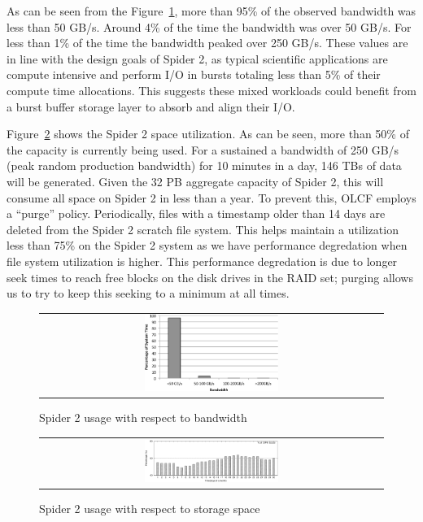 As can be seen from the Figure~\ref{fig:bwUsage}, more than 95\% of the 
observed bandwidth was less than 50 GB/s. Around 4\% of the time the bandwidth
was over 50 GB/s. For less than 1\% of the time the bandwidth peaked over
250 GB/s. These values are in line with the design goals of Spider 2, as
typical scientific applications are compute intensive and perform
I/O in bursts totaling less than 5\% of their compute time allocations. This suggests these 
mixed workloads could benefit from a burst buffer storage layer to absorb and align 
their I/O.

Figure~\ref{fig:storageUsage} shows the Spider 2 space utilization. As can be
seen, more than 50\% of the capacity is currently being used.  For a sustained a
bandwidth of 250 GB/s (peak random production bandwidth) for 10 minutes in a
day, 146 TBs of data will be generated. Given the 32 PB aggregate capacity of
Spider 2, this will consume all space on Spider 2 in less than a year. To
prevent this, OLCF employs a ``purge'' policy. Periodically, files with a
timestamp older than 14 days are deleted from the Spider 2 scratch file system.
This helps maintain a utilization less than 75\% on the Spider 2 system as we 
have performance degredation when file system utilization is higher. This performance 
degredation is due to longer seek times to reach free blocks on the disk drives in the 
RAID set; purging allows us to try to keep this seeking to a minimum at all times.


\begin{figure}[!thb]
\begin{center}
\begin{tabular}{c}
{\includegraphics[width=0.40\textwidth]{./figs/bwUsage.eps}}\\
\end{tabular}
\vspace{-0.1in}
\caption{Spider 2 usage with respect to bandwidth}
\label{fig:bwUsage}
\end{center}
\end{figure}



\begin{figure}[!thb]
\begin{center}
\begin{tabular}{c}
{\includegraphics[width=0.40\textwidth]{./figs/storageUsage.eps}}\\
\end{tabular}
\vspace{-0.1in}
\caption{Spider 2 usage with respect to storage space}
\label{fig:storageUsage}
\end{center}
\end{figure}


